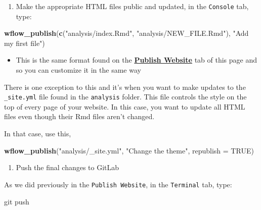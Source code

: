 \documentclass[openany]{book}
\newenvironment{Shaded}{\begin{snugshade}}{\end{snugshade}}
\newcommand{\DataTypeTok}[1]{\textcolor[rgb]{0.13,0.29,0.53}{#1}}
\newcommand{\KeywordTok}[1]{\textcolor[rgb]{0.13,0.29,0.53}{\textbf{#1}}}
\newcommand{\NormalTok}[1]{#1}
\newcommand{\OtherTok}[1]{\textcolor[rgb]{0.56,0.35,0.01}{#1}}
\newcommand{\StringTok}[1]{\textcolor[rgb]{0.31,0.60,0.02}{#1}}
\providecommand{\tightlist}{%
  \setlength{\itemsep}{0pt}\setlength{\parskip}{0pt}}
\begin{document}
\begin{enumerate}
\def\labelenumi{\arabic{enumi}.}
\setcounter{enumi}{1}
\tightlist
\item
  Make the appropriate HTML files public and updated, in the \texttt{Console} tab, type:
\end{enumerate}

\begin{Shaded}
\begin{Highlighting}[]
\KeywordTok{wflow_publish}\NormalTok{(}\KeywordTok{c}\NormalTok{(}\StringTok{"analysis/index.Rmd"}\NormalTok{, }\StringTok{"analysis/NEW_FILE.Rmd"}\NormalTok{), }\StringTok{"Add my first file"}\NormalTok{)}
\end{Highlighting}
\end{Shaded}

\begin{itemize}
\tightlist
\item
  This is the same format found on the \protect\hyperlink{publish-website}{\textbf{Publish Website}} tab of this page and so you can customize it in the same way
\end{itemize}

There is one exception to this and it's when you want to make updates to the \texttt{\_site.yml} file found in the \texttt{analysis} folder. This file controls the style on the top of every page of your website. In this case, you want to update all HTML files even though their Rmd files aren't changed.

In that case, use this,

\begin{Shaded}
\begin{Highlighting}[]
\KeywordTok{wflow_publish}\NormalTok{(}\StringTok{"analysis/_site.yml"}\NormalTok{, }\StringTok{"Change the theme"}\NormalTok{, }\DataTypeTok{republish =} \OtherTok{TRUE}\NormalTok{)}
\end{Highlighting}
\end{Shaded}

\begin{enumerate}
\def\labelenumi{\arabic{enumi}.}
\setcounter{enumi}{2}
\tightlist
\item
  Push the final changes to GitLab
\end{enumerate}

As we did previously in the \texttt{Publish\ Website}, in the \texttt{Terminal} tab, type:

\begin{Shaded}
\begin{Highlighting}[]
\NormalTok{git push}
\end{Highlighting}
\end{Shaded}
\end{document}
